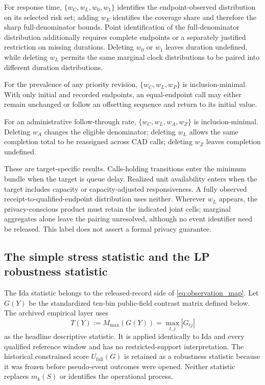 \documentclass[11pt]{article}
\begin{document}
\begin{plainbox}[title=Target-specific witness-necessity results]
For response time, $\{w_C,w_L,w_0,w_1\}$ identifies the endpoint-observed distribution on its selected risk set; adding $w_E$ identifies the coverage share and therefore the sharp full-denominator bounds. Point identification of the full-denominator distribution additionally requires complete endpoints or a separately justified restriction on missing durations. Deleting $w_0$ or $w_1$ leaves duration undefined, while deleting $w_L$ permits the same marginal clock distributions to be paired into different duration distributions.

For the prevalence of any priority revision, $\{w_C,w_L,w_P\}$ is inclusion-minimal. With only initial and recorded endpoints, an equal-endpoint call may either remain unchanged or follow an offsetting sequence and return to its initial value.

For an administrative follow-through rate, $\{w_C,w_L,w_A,w_Z\}$ is inclusion-minimal. Deleting $w_A$ changes the eligible denominator; deleting $w_L$ allows the same completion total to be reassigned across CAD calls; deleting $w_Z$ leaves completion undefined.
\end{plainbox}

These are target-specific results. Calls-holding transitions enter the minimum bundle when the target is queue delay. Realized unit availability enters when the target includes capacity or capacity-adjusted responsiveness. A fully observed receipt-to-qualified-endpoint distribution uses neither. Wherever $w_L$ appears, the privacy-conscious product must retain the indicated joint cells; marginal aggregates alone leave the pairing unresolved, although no event identifier need be released. This label does not assert a formal privacy guarantee.

\subsection{The simple stress statistic and the LP robustness statistic}

The Ida statistic belongs to the released-record side of \cref{eq:observation_map}. Let $G(Y)$ be the standardized ten-bin public-field contrast matrix defined below. The archived empirical layer uses
\begin{equation}
T(Y):=M_{\max}(G(Y))=\max_{t,j}|G_{tj}|
\label{eq:stress_diagnostic}
\end{equation}
as the headline descriptive statistic. It is applied identically to Ida and every qualified reference window and has no restricted-support interpretation. The historical constrained score $U_{\mathrm{full}}(G)$ is retained as a robustness statistic because it was frozen before pseudo-event outcomes were opened. Neither statistic replaces $m_k(S)$ or identifies the operational process.
\end{document}

